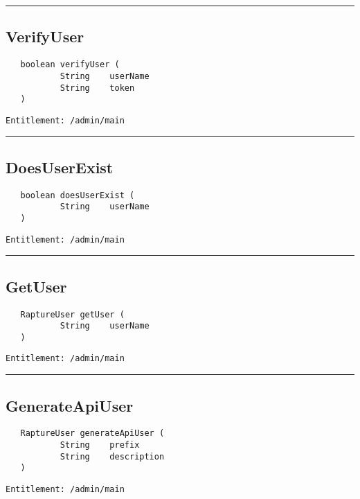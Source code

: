 \rule{12cm}{2pt}
\subsection{VerifyUser}
\label{Api:VerifyUser}
\begin{Verbatim}
   boolean verifyUser (
           String    userName
           String    token
   )
\end{Verbatim}
\begin{Verbatim}[formatcom=\color{Maroon}]
  Entitlement: /admin/main
\end{Verbatim}



\rule{12cm}{2pt}
\subsection{DoesUserExist}
\label{Api:DoesUserExist}
\begin{Verbatim}
   boolean doesUserExist (
           String    userName
   )
\end{Verbatim}
\begin{Verbatim}[formatcom=\color{Maroon}]
  Entitlement: /admin/main
\end{Verbatim}



\rule{12cm}{2pt}
\subsection{GetUser}
\label{Api:GetUser}
\begin{Verbatim}
   RaptureUser getUser (
           String    userName
   )
\end{Verbatim}
\begin{Verbatim}[formatcom=\color{Maroon}]
  Entitlement: /admin/main
\end{Verbatim}



\rule{12cm}{2pt}
\subsection{GenerateApiUser}
\label{Api:GenerateApiUser}
\begin{Verbatim}
   RaptureUser generateApiUser (
           String    prefix
           String    description
   )
\end{Verbatim}
\begin{Verbatim}[formatcom=\color{Maroon}]
  Entitlement: /admin/main
\end{Verbatim}



